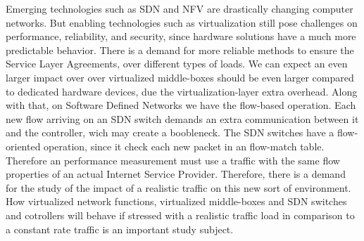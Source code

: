 Emerging technologies such as SDN and NFV are  drastically changing  computer networks. But enabling technologies such as virtualization still pose challenges on performance,  reliability, and security\cite{nfv-challenges}, since hardware solutions  have a much more predictable behavior. There is a demand for more reliable methods to ensure the Service Layer Agreements, over different types of loads. We can expect an even larger impact over over virtualized middle-boxes should be even larger compared to dedicated hardware devices, due the virtualization-layer extra overhead. Along with that, on Software Defined Networks we have the flow-based operation. Each new flow arriving on an SDN switch demands an extra communication between it and the controller, wich may create a boobleneck. The SDN switches have a flow-oriented operation, since it check each new packet in an flow-match table. Therefore an performance measurement must use a traffic with the same flow properties of an actual Internet Service Provider. Therefore, there is a demand for the study of the impact of a realistic traffic on this new sort of environment. How virtualized network functions,  virtualized middle-boxes and SDN switches and cotrollers will behave if stressed with a realistic traffic load in comparison to a constant rate traffic is an important study subject. 

